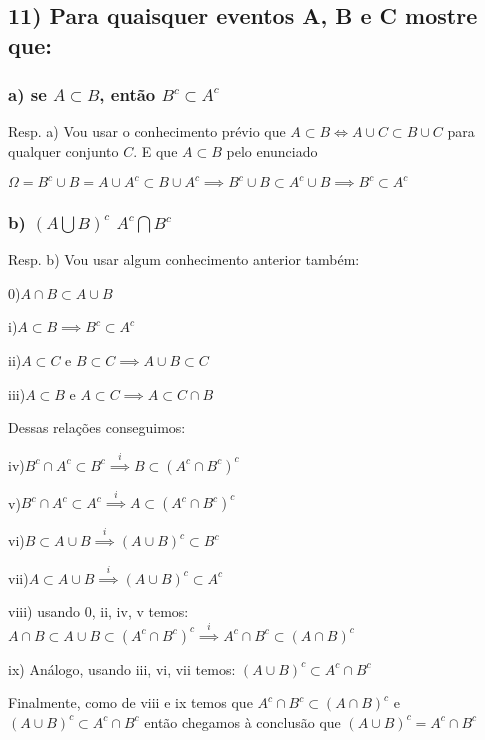 \documentclass[english]{article}
\begin{document}
\subsection*{\textmd{11) Para quaisquer eventos A, B e C mostre que:}}


\subsubsection*{\textmd{a) se $A\subset B$, então $B^{c}\subset A^{c}$}}

Resp. a) Vou usar o conhecimento prévio que $A\subset B\Longleftrightarrow A\cup C\subset B\cup C$
para qualquer conjunto $C.$ E que $A\subset B$ pelo enunciado

$\Omega=B^{c}\cup B=A\cup A^{c}\subset B\cup A^{c}\implies B^{c}\cup B\subset A^{c}\cup B\implies B^{c}\subset A^{c}$


\subsubsection*{\textmd{b) $(A\bigcup B)^{c}$ $A^{c}\bigcap B^{c}$ }}

Resp. b) Vou usar algum conhecimento anterior também:

0)$A\cap B\subset A\cup B$

i)$A\subset B\implies B^{c}\subset A^{c}$

ii)$A\subset C$ e $B\subset C\implies A\cup B\subset C$

iii)$A\subset B$ e $A\subset C\implies A\subset C\cap B$

Dessas relações conseguimos:

iv)$B^{c}\cap A^{c}\subset B^{c}\overset{i}{\implies}B\subset(A^{c}\cap B^{c})^{c}$

v)$B^{c}\cap A^{c}\subset A^{c}\overset{i}{\implies}A\subset(A^{c}\cap B^{c})^{c}$

vi)$B\subset A\cup B\overset{i}{\implies}(A\cup B)^{c}\subset B^{c}$

vii)$A\subset A\cup B\overset{i}{\implies}(A\cup B)^{c}\subset A^{c}$

viii) usando 0, ii, iv, v temos: $A\cap B\subset A\cup B\subset(A^{c}\cap B^{c})^{c}\overset{i}{\implies}A^{c}\cap B^{c}\subset(A\cap B)^{c}$

ix) Análogo, usando iii, vi, vii temos: $(A\cup B)^{c}\subset A^{c}\cap B^{c}$

Finalmente, como de viii e ix temos que $A^{c}\cap B^{c}\subset(A\cap B)^{c}$
e $(A\cup B)^{c}\subset A^{c}\cap B^{c}$ então chegamos à conclusão
que $(A\cup B)^{c}=A^{c}\cap B^{c}$
\end{document}
